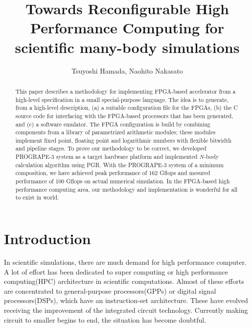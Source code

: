\documentclass{llncs}
\begin{document}
\def\addtocontents#1#2{}%
\def\addcontentsline#1#2#3{}%
\def\markboth#1#2{}%
%
\title{Towards Reconfigurable High Performance Computing for scientific many-body simulations}

\author{Tsuyoshi Hamada, Naohito Nakasato}


\maketitle
%
\begin{abstract}
This paper describes a methodology for implementing FPGA-based
accelerator from a high-level specification in a small special-purpose
language.  The idea is to generate, from a high-level description, (a)
a suitable configuration file for the FPGAs, (b) the C source code for
interfacing with the FPGA-based processors that has been generated,
and (c) a software emulator. The FPGA configuration is build by
combining components from a library of parametrized arithmetic
modules; these modules implement fixed point, floating point and
logarithmic numbers with flexible bitwidth and pipeline stages.  To
prove our methodology to be correct, we developed PROGRAPE-3 system as
a target hardware platform and implemented $N$-body calculation
algorithm using PGR.  With the PROGRAPE-3 system of a minimum
composition, we have achieved peak performance of 162 Gflops and
mesured performance of 100 Gflops on actual numerical simulation.
In the FPGA-based high performance computing area,
our methodology and implementation is wonderful for all to exist in world.
\end{abstract}
%
\section{Introduction}
%
In scientific simulations, there are much demand for high performance computer.
A lot of effort has been dedicated to super computing or high
performance computing(HPC) architecture in scientific computations.
Almost of these efforts are concentrated to general-purpose
processors(GPPs) or digital signal processors(DSPs), which have an
instruction-set architecture.  These have evolved receiving the
improvement of the integrated circuit technology.  Currently making
circuit to smaller begins to end, the situation has become doubtful.
\end{document}
